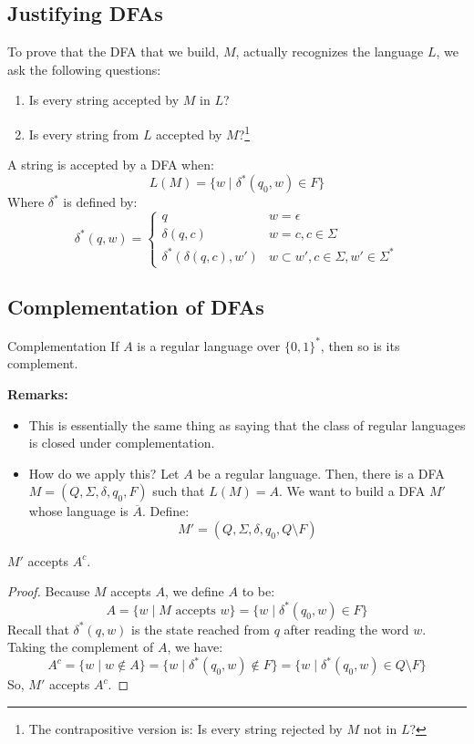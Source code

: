 \documentclass[letterpaper]{article}
\begin{document}
\subsection{Justifying DFAs}
To prove that the DFA that we build, $M$, actually recognizes the language $L$, we ask the following questions: 
\begin{enumerate}
    \item Is every string accepted by $M$ in $L$?
    \item Is every string from $L$ accepted by $M$?\footnote{The contrapositive version is: Is every string rejected by $M$ not in $L$?}
\end{enumerate}
A string is accepted by a DFA when: 
\[ L(M) = \{ w \mid \delta^{*}(q_0, w) \in F \} \]
Where $\delta^*$ is defined by: 
\[\delta^{*}(q, w) = \begin{cases}
    q & w = \epsilon \\ 
    \delta(q, c) & w = c, c \in \Sigma \\ 
    \delta^{*}(\delta(q, c), w') & w \subset w', c \in \Sigma, w' \in \Sigma^*
\end{cases}\]


\subsection{Complementation of DFAs}
\begin{theorem}{Complementation}{}
    If $A$ is a regular language over $\{0, 1\}^*$, then so is its complement. 
\end{theorem}
\textbf{Remarks:}
\begin{itemize}
    \item This is essentially the same thing as saying that the class of regular languages is closed under complementation.
    \item How do we apply this? Let $A$ be a regular language. Then, there is a DFA $M = (Q, \Sigma, \delta, q_0, F)$ such that $L(M) = A$. We want to build a DFA $M'$ whose language is $\overline{A}$. Define: 
    \[M' = (Q, \Sigma, \delta, q_0, Q \setminus F)\]
\end{itemize}

\begin{proposition}
    $M'$ accepts $A^c$.
\end{proposition}

\begin{mdframed}[]
    \begin{proof}
        Because $M$ accepts $A$, we define $A$ to be: 
        \[A = \{w \mid M \text{ accepts } w\} = \{w \mid \delta^{*}(q_0, w) \in F\}\]
        Recall that $\delta^{*}(q, w)$ is the state reached from $q$ after reading the word $w$. Taking the complement of $A$, we have: 
        \[A^c = \{w \mid w \notin A\} = \{w \mid \delta^{*}(q_0, w) \notin F\} = \{w \mid \delta^{*}(q_0, w) \in Q \setminus F\}\]
        So, $M'$ accepts $A^c$. 
    \end{proof}
\end{mdframed}
\end{document}
